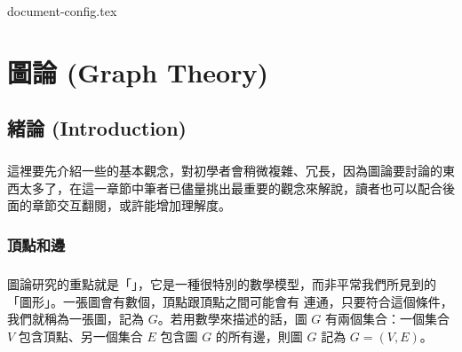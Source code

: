 \documentclass[12pt,a4paper,oneside]{report}
\begin{document}
\begin{CJK}{UTF8}{bkai}

{document-config.tex}
\setcounter{chapter}{8}

\fi

\providecommand*{\UEdge}[2]{\ensuremath{({#1},{#2})}}
\providecommand*{\DEdge}[2]{\ensuremath{\langle{}{{#1},{#2}}\rangle{}}}
\providecommand*{\Deg}[2][G]{\ensuremath{d_{#1}{(#2)}}}
\providecommand*{\OutDeg}[2][G]{\ensuremath{d^{+}_{#1}{(#2)}}}
\providecommand*{\InDeg}[2][G]{\ensuremath{d^{-}_{#1}{(#2)}}}

\label{tag:def_constant}
\newcommand*{\SelectedVertexStyle}{%
   \SetVertexNormal[
     MinSize=24pt,%
     LineWidth=1.5pt,%
     FillColor=black!20]}

\chapter{圖論 (Graph Theory)}
\section{緒論 (Introduction)}
\paragraph{}這裡要先介紹一些的基本觀念，對初學者會稍微複雜、冗長，因為圖論要討論的東西太多了，在這一章節中筆者已儘量挑出最重要的觀念來解說，讀者也可以配合後面的章節交互翻閱，或許能增加理解度。

\subsection{頂點和邊}
\paragraph{}圖論研究的重點就是「\textbf{}」，它是一種很特別的數學模型，而非平常我們所見到的「圖形」。一張圖會有數個\textbf{}，頂點跟頂點之間可能會有\textbf{} 連通，只要符合這個條件，我們就稱為一張圖，記為 $G$。若用數學來描述的話，圖 $G$ 有兩個集合：一個集合 $V$ 包含頂點、另一個集合 $E$ 包含圖 $G$ 的所有邊，則圖 $G$ 記為 $G=(V,E)$。

\end{CJK}
\end{document}
